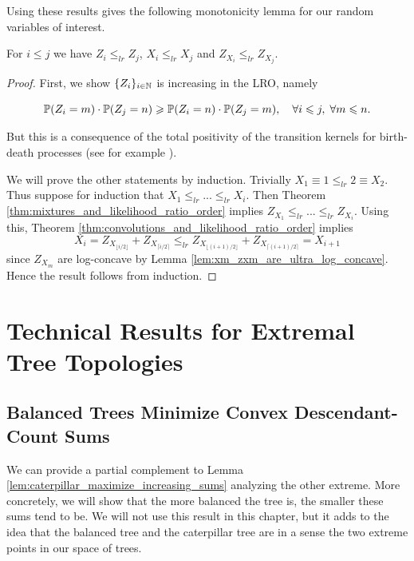 \begin{subappendices}
\noindent Using these results gives the following monotonicity lemma for our random variables of interest.

\begin{lemma}
\label{lem:xi_zxi_increasing_in_lro}
For $i \leq j$ we have $Z_i \leq_{lr} Z_j$, $X_i \leq_{lr} X_j$ and $Z_{X_i} \leq_{lr} Z_{X_j}$.
\end{lemma}

\begin{proof}
    First, we show $\{Z_i\}_{i \in \N}$ is increasing in the LRO, namely

    \[\P(Z_i = m) \cdot \P(Z_j = n) \geq \P(Z_i = n)\cdot \P(Z_j  = m), \quad \forall i \leq j, \; \forall m \leq n. \]

    \noindent But this is a consequence of the total positivity of the transition kernels for birth-death processes (see for example \cite{karlin1959_coincidence_probabilities}).

    We will prove the other statements by induction. Trivially $X_1 \equiv 1 \leq_{lr} 2 \equiv X_2$. Thus suppose for induction that $X_1 \leq_{lr} ... \leq_{lr} X_i$. Then Theorem \ref{thm:mixtures_and_likelihood_ratio_order} implies $Z_{X_1} \leq_{lr} ... \leq_{lr} Z_{X_i}$. Using this, Theorem \ref{thm:convolutions_and_likelihood_ratio_order} implies
    \[X_i = Z_{X_{\lfloor i/2 \rfloor}} + Z_{X_{\lceil i/2 \rceil}} \leq_{lr} Z_{X_{\lfloor (i+1)/2 \rfloor}} + Z_{X_{\lceil (i+1)/2 \rceil}} = X_{i+1}\]
    \noindent since $Z_{X_m}$ are log-concave by Lemma \ref{lem:xm_zxm_are_ultra_log_concave}. Hence the result follows from induction.

\end{proof}











\newpage
\section{Technical Results for Extremal Tree Topologies}
\label{app:main-upper-bound-proofs}

\subsection{Balanced Trees Minimize Convex Descendant-Count Sums}
\noindent We can provide a partial complement to Lemma \ref{lem:caterpillar_maximize_increasing_sums} analyzing the other extreme. More concretely, we will show that the more balanced the tree is, the smaller these sums tend to be. We will not use this result in this chapter, but it adds to the idea that the balanced tree and the caterpillar tree are in a sense the two extreme points in our space of trees.


\end{subappendices}
